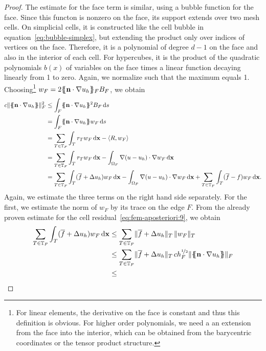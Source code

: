 \begin{proof}
    The estimate for the face term is similar, using a bubble function
    for the face. Since this functon is nonzero on the face, its
    support extends over two mesh cells. On simplicial cells, it is
    constructed like the cell bubble in
    equation~\eqref{eq:bubble-simplex}, but extending the product only
    over indices of vertices on the face. Therefore, it is a
    polynomial of degree $d-1$ on the face and also in the interior of
    each cell. For hypercubes, it is the product of the quadratic
    polynomials $b(x)$ of variables on the face times a linear
    function decaying linearly from 1 to zero. Again, we normalize
    such that the maximum equals 1. Choosing\footnote{For linear
      elements, the derivative on the face is constant and thus this
      definition is obvious. For higher order polynomials, we need a
      an extension from the face into the interior, which can be
      obtained from the barycentric coordinates or the tensor product
      structure.} $w_F = 2\{\!\!\{\mathbf n\cdot\nabla u_h\}\!\!\}_F B_F$, we obtain
    \begin{align*}
      c\norm{\mvl{\n\cdot\nabla u_h}}_F^2
      &\le \int_F \mvl{\n\cdot\nabla u_h}^2 B_F \ds
      \\&= \int_F \mvl{\n\cdot\nabla u_h} w_F \ds
      \\&= \sum_{\cell\in\mesh_F} \int_\cell r_\cell w_F \dvx - \left<R,w_F\right>
      \\&= \sum_{\cell\in\mesh_F} \int_\cell r_\cell w_F \dvx
      - \int_{\domain_F} \nabla (u-u_h)\cdot\nabla w_F \dvx
      \\&= \sum_{\cell\in\mesh_F} \int_\cell (\overline f + \Delta u_h) w_F \dvx
      - \int_{\domain_F} \nabla (u-u_h)\cdot\nabla w_F \dvx
      + \sum_{\cell\in\mesh_F} \int_\cell (\overline f - f)w_F \dvx.
    \end{align*}
    Again, we estimate the three terms on the right hand side
    separately. For the first, we estimate the norm of $w_F$ by its
    trace on the edge $F$. From the already proven estimate for the
    cell residual~\eqref{eq:fem-aposteriori:9}, we obtain
    \begin{align*}
      \sum_{\cell\in\mesh_F} \int_\cell (\overline f + \Delta u_h) w_F \dvx
      & \le \sum_{\cell\in\mesh_F} \norm{\overline f + \Delta u_h}_\cell
        \,\norm{w_F}_{\cell}
      \\&\le \sum_{\cell\in\mesh_F} \norm{\overline f + \Delta u_h}_\cell
      \,c h_F^{\nicefrac12} \norm{\mvl{\n\cdot\nabla u_h}}_F
      \\&\le 

\end{align*}
\end{proof}
